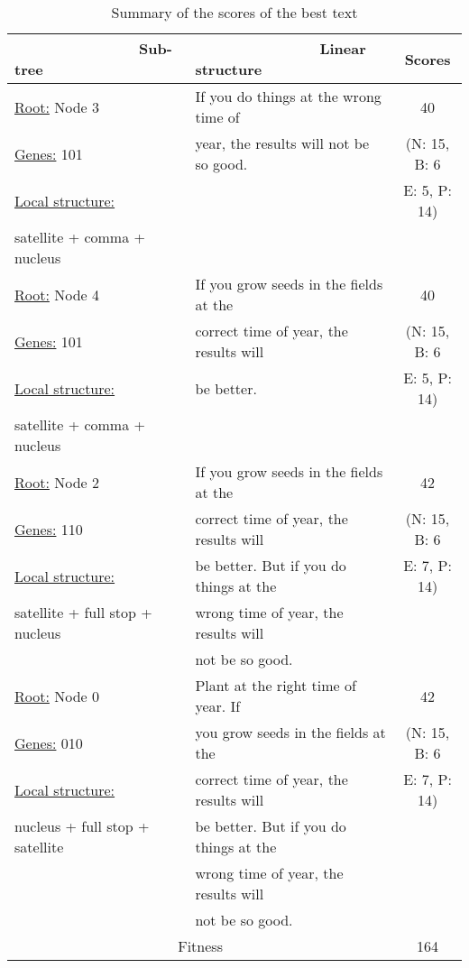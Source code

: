 \documentclass[english]{jnlp_1.2.0}
\begin{document}
\begin{table}[t]
\caption{Summary of the scores of the best text}
\begin{center}
 \begin{tabular}{|l|l|c|}               \hline
~~~~~~~~~~~~~~~Sub-tree                       &~~~~~~~~~~~~~~~Linear structure & Scores \\ \hline \hline
\underline{Root:} Node 3                      & If you do things at the wrong time of &     40 \\ 
\underline{Genes:} 101                        & year, the results will not be so good. & (N: 15, B: 6  \\ 
\underline{Local structure:}                  &                                        & E: 5, P: 14) \\
satellite + comma + nucleus                   &                                        & \\ \hline
\underline{Root:} Node 4                      & If you grow seeds in the fields at the & 40 \\
\underline{Genes:} 101                        & correct time of year, the results will & (N: 15, B: 6\\ 
\underline{Local structure:}                  & be better.                             & E: 5, P: 14)\\
satellite + comma + nucleus                   &                                        & \\ \hline
\underline{Root:} Node 2                      & If you grow seeds in the fields at the & 42 \\  
\underline{Genes:} 110                        & correct time of year, the results will & (N: 15, B: 6 \\
\underline{Local structure:}                  & be better. But if you do things at the & E: 7, P: 14) \\
satellite + full stop + nucleus               & wrong time of year, the results will   & \\
                                              & not be so good. & \\ \hline
\underline{Root:} Node 0                      & Plant at the right time of year. If   & 42 \\ 
\underline{Genes:} 010                        & you grow seeds in the fields at the  & (N: 15, B: 6 \\
\underline{Local structure:}                  & correct time of year, the results will & E: 7, P: 14) \\
nucleus + full stop + satellite               & be better. But if you do things at the &  \\
                                              & wrong time of year, the results will & \\
                                              & not be so good. & \\ \hline \hline
\multicolumn{2}{|c|}{Fitness} & 164 \\ \hline
\end{tabular}
\end{center}
\end{table}
\end{document}
